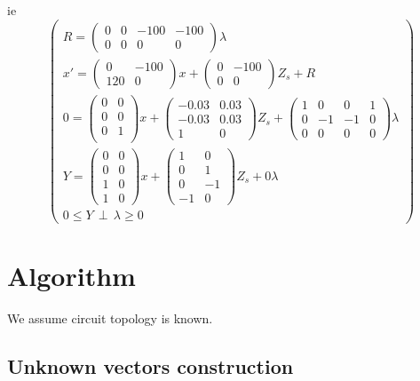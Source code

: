 \documentclass[10pt]{article}
\begin{document}
ie
\[
\left(\begin{array}{c}
R=\left(\begin{array}{cccc}
0&0&-100&-100\\
0&0&0&0\end{array} \right) \lambda\\
  
x'=\left(\begin{array}{cc}
0 &-100\\
120&0\end{array} \right)x
+\left(\begin{array}{cc}
0&-100\\
0&0\end{array} \right)Z_{s}+R\\
0=\left(\begin{array}{cc}
0 &0\\
0 &0\\
0 &1\\\end{array} \right)x
+\left(\begin{array}{cc}
-0.03&0.03\\
-0.03&0.03\\
1&0\end{array} \right)Z_{s}
+\left(\begin{array}{cccc}
1&0&0&1\\
0&-1&-1&0\\
0&0&0&0\end{array} \right)\lambda\\
Y=\left(\begin{array}{cc}
0&0\\
0&0\\
1&0\\
1&0\end{array}\right) x+
\left(\begin{array}{cc}
1&0\\
0&1\\
0&-1\\
-1&0\end{array}
\right) Z_{s} +0\lambda\\

0 \leq Y \, \perp \, \lambda \geq 0

\end{array}
\right)
\]
\newpage
\section{Algorithm}
We assume circuit topology is known.
\subsection{Unknown vectors construction}
\end{document}
